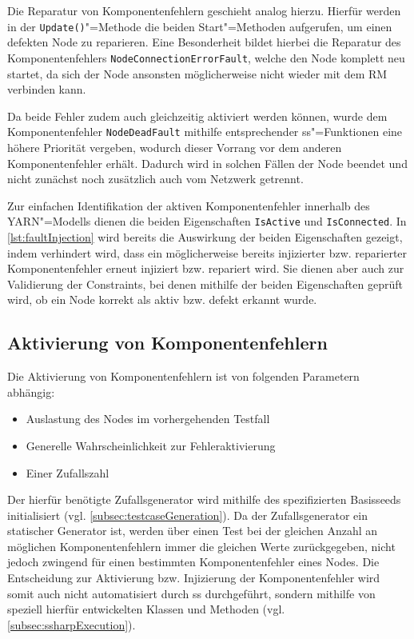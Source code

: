 Die Reparatur von Komponentenfehlern geschieht analog hierzu.
Hierfür werden in der \texttt{Update()}"=Methode die beiden Start"=Methoden aufgerufen, um einen defekten Node zu reparieren.
Eine Besonderheit bildet hierbei die Reparatur des Komponentenfehlers \texttt{NodeConnectionErrorFault}, welche den Node komplett neu startet, da sich der Node ansonsten möglicherweise nicht wieder mit dem \gls{RM} verbinden kann.

Da beide Fehler zudem auch gleichzeitig aktiviert werden können, wurde dem Komponentenfehler \texttt{NodeDeadFault} mithilfe entsprechender \gls{ss}"=Funktionen eine höhere Priorität vergeben, wodurch dieser Vorrang vor dem anderen Komponentenfehler erhält.
Dadurch wird in solchen Fällen der Node beendet und nicht zunächst noch zusätzlich auch vom Netzwerk getrennt.

Zur einfachen Identifikation der aktiven Komponentenfehler innerhalb des YARN"=Modells dienen die beiden Eigenschaften \texttt{IsActive} und \texttt{IsConnected}.
In \cref{lst:faultInjection} wird bereits die Auswirkung der beiden Eigenschaften gezeigt, indem verhindert wird, dass ein möglicherweise bereits injizierter bzw. reparierter Komponentenfehler erneut injiziert bzw. repariert wird.
Sie dienen aber auch zur Validierung der Constraints, bei denen mithilfe der beiden Eigenschaften geprüft wird, ob ein Node korrekt als aktiv bzw. defekt erkannt wurde.

\subsection{Aktivierung von Komponentenfehlern}
\label{subsec:faultActivation}

Die Aktivierung von Komponentenfehlern ist von folgenden Parametern abhängig:

\begin{itemize}
    \item Auslastung des Nodes im vorhergehenden Testfall
    \item Generelle Wahrscheinlichkeit zur Fehleraktivierung
    \item Einer Zufallszahl
\end{itemize}

Der hierfür benötigte Zufallsgenerator wird mithilfe des spezifizierten Basisseeds initialisiert (vgl. \cref{subsec:testcaseGeneration}).
Da der Zufallsgenerator ein statischer Generator ist, werden über einen Test bei der gleichen Anzahl an möglichen Komponentenfehlern immer die gleichen Werte zurückgegeben, nicht jedoch zwingend für einen bestimmten Komponentenfehler eines Nodes.
Die Entscheidung zur Aktivierung bzw. Injizierung der Komponentenfehler wird somit auch nicht automatisiert durch \gls{ss} durchgeführt, sondern mithilfe von speziell hierfür entwickelten Klassen und Methoden (vgl. \cref{subsec:ssharpExecution}).

